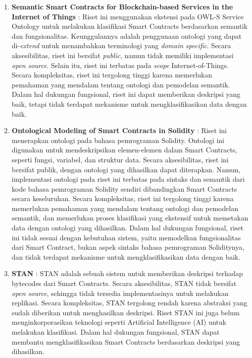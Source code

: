 \begin{enumerate}
    \item \textbf{Semantic Smart Contracts for Blockchain-based Services in the Internet of Things} \parencite{baqa2019semantic}: Riset ini menggunakan ekstensi pada OWL-S Service Ontology untuk melakukan klasifikasi Smart Contracts berdasarkan semantik dan fungsionalitas. Keunggulannya adalah penggunaan ontologi yang dapat di-\textit{extend} untuk menambahkan terminologi yang \textit{domain specific}. Secara aksesibilitas, riset ini bersifat \textit{public}, namun tidak memiliki implementasi \textit{open source}. Selain itu, riset ini terbatas pada \textit{scope} Internet-of-Things. Secara kompleksitas, riset ini tergolong tinggi karena memerlukan pemahaman yang mendalam tentang ontologi dan pemodelan semantik. Dalam hal dukungan fungsional, riset ini dapat memberikan deskripsi yang baik, tetapi tidak terdapat mekanisme untuk mengklasifikasikan data dengan baik.
    
    \item \textbf{Ontological Modeling of Smart Contracts in Solidity} \parencite{cano2021toward}: Riset ini menerapkan ontologi pada bahasa pemrograman Solidity. Ontologi ini digunakan untuk mendeskripsikan elemen-elemen dalam Smart Contracts, seperti fungsi, variabel, dan struktur data. Secara aksesibilitas, riset ini bersifat publik, dengan ontologi yang dihasilkan dapat diterapkan. Namun, implementasi ontologi pada riset ini terbatas pada sintaks dan semantik dari kode bahasa pemrograman Solidity sendiri dibandingkan Smart Contracts secara keseluruhan. Secara kompleksitas, riset ini tergolong tinggi karena memerlukan pemahaman yang mendalam tentang ontologi dan pemodelan semantik, dan memerlukan proses klasifikasi yang ekstensif untuk memetakan data dengan ontologi yang dihasilkan. Dalam hal dukungan fungsional, riset ini tidak sesuai dengan kebutuhan sistem, yaitu memodelkan fungsionalitas dari Smart Contract, bukan aspek sintaks bahasa pemrograman Soliditynya, dan tidak terdapat mekanisme untuk mengklasifikasikan data dengan baik.
    
    \item \textbf{STAN} \parencite{stan}: STAN adalah sebuah sistem untuk memberikan deskripsi terhadap bytecodes dari Smart Contracts. Secara aksesibilitas, STAN tidak bersifat \textit{open source}, sehingga tidak tersedia implementasinya untuk melakukan replikasi. Secara kompleksitas, STAN tergolong rendah karena abstraksi yang sudah diberikan untuk menghasilkan deskripsi. Riset STAN ini juga belum menginkorporasikan teknologi seperti Artificial Intelligence (AI) untuk melakukan klasifikasi. Dalam hal dukungan fungsional, STAN dapat membantu mengklasifikasikan Smart Contracts berdasarkan deskripsi yang dihasilkan.
    

\end{enumerate}
